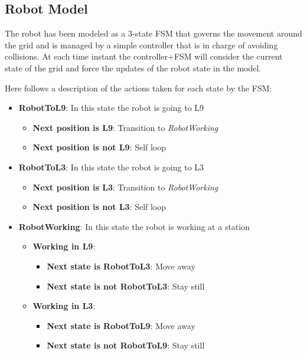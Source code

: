 \subsection{Robot Model}

The robot has been modeled as a 3-state FSM that governs the movement around the grid and is managed by a simple controller that is in charge of avoiding collisions. At each time instant the controller+FSM will consider the current state of the grid and force the updates of the robot state in the model.

Here follows a description of the actions taken for each state by the FSM:
\begin{itemize}
	\item \textbf{RobotToL9}: In this state the robot is going to L9
	\begin{itemize}
		\item \textbf{Next position is L9}: Transition to \textit{RobotWorking}
		\item \textbf{Next position is not L9}: Self loop
	\end{itemize}

	\item \textbf{RobotToL3}: In this state the robot is going to L3
	\begin{itemize}
		\item \textbf{Next position is L3}: Transition to \textit{RobotWorking}
		\item \textbf{Next position is not L3}: Self loop
	\end{itemize}

	\item \textbf{RobotWorking}: In this state the robot is working at a station
	\begin{itemize}
		\item \textbf{Working in L9}:
			\begin{itemize}
				\item \textbf{Next state is RobotToL3}: Move away
				\item \textbf{Next state is not RobotToL3}: Stay still
			\end{itemize}
		\item \textbf{Working in L3}:
			\begin{itemize}
				\item \textbf{Next state is RobotToL9}: Move away
				\item \textbf{Next state is not RobotToL9}: Stay still
			\end{itemize}
	\end{itemize}
\end{itemize}

